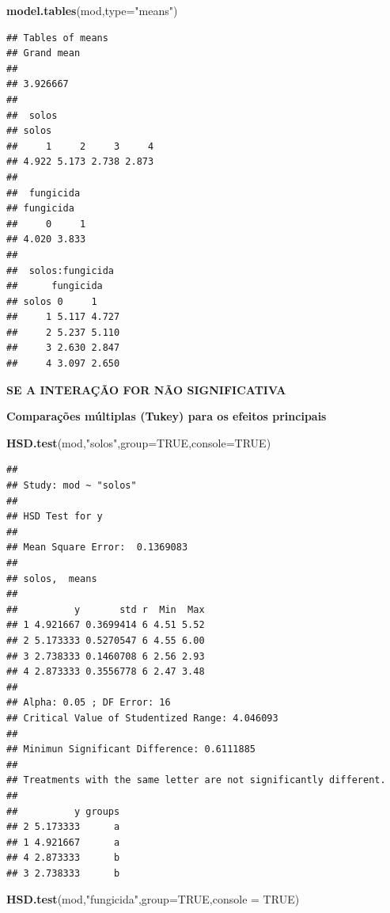 \documentclass[
]{book}
\newenvironment{Shaded}{\begin{snugshade}}{\end{snugshade}}
\newcommand{\DataTypeTok}[1]{\textcolor[rgb]{0.13,0.29,0.53}{#1}}
\newcommand{\KeywordTok}[1]{\textcolor[rgb]{0.13,0.29,0.53}{\textbf{#1}}}
\newcommand{\NormalTok}[1]{#1}
\newcommand{\OtherTok}[1]{\textcolor[rgb]{0.56,0.35,0.01}{#1}}
\newcommand{\StringTok}[1]{\textcolor[rgb]{0.31,0.60,0.02}{#1}}
\begin{document}
\begin{Shaded}
\begin{Highlighting}[]
\KeywordTok{model.tables}\NormalTok{(mod,}\DataTypeTok{type=}\StringTok{"means"}\NormalTok{)}
\end{Highlighting}
\end{Shaded}

\begin{verbatim}
## Tables of means
## Grand mean
##          
## 3.926667 
## 
##  solos 
## solos
##     1     2     3     4 
## 4.922 5.173 2.738 2.873 
## 
##  fungicida 
## fungicida
##     0     1 
## 4.020 3.833 
## 
##  solos:fungicida 
##      fungicida
## solos 0     1    
##     1 5.117 4.727
##     2 5.237 5.110
##     3 2.630 2.847
##     4 3.097 2.650
\end{verbatim}

\textbf{SE A INTERAÇÃO FOR NÃO SIGNIFICATIVA}

\textbf{Comparações múltiplas (Tukey) para os efeitos principais}

\begin{Shaded}
\begin{Highlighting}[]
\KeywordTok{HSD.test}\NormalTok{(mod,}\StringTok{"solos"}\NormalTok{,}\DataTypeTok{group=}\OtherTok{TRUE}\NormalTok{,}\DataTypeTok{console=}\OtherTok{TRUE}\NormalTok{)}
\end{Highlighting}
\end{Shaded}

\begin{verbatim}
## 
## Study: mod ~ "solos"
## 
## HSD Test for y 
## 
## Mean Square Error:  0.1369083 
## 
## solos,  means
## 
##          y       std r  Min  Max
## 1 4.921667 0.3699414 6 4.51 5.52
## 2 5.173333 0.5270547 6 4.55 6.00
## 3 2.738333 0.1460708 6 2.56 2.93
## 4 2.873333 0.3556778 6 2.47 3.48
## 
## Alpha: 0.05 ; DF Error: 16 
## Critical Value of Studentized Range: 4.046093 
## 
## Minimun Significant Difference: 0.6111885 
## 
## Treatments with the same letter are not significantly different.
## 
##          y groups
## 2 5.173333      a
## 1 4.921667      a
## 4 2.873333      b
## 3 2.738333      b
\end{verbatim}

\begin{Shaded}
\begin{Highlighting}[]
\KeywordTok{HSD.test}\NormalTok{(mod,}\StringTok{"fungicida"}\NormalTok{,}\DataTypeTok{group=}\OtherTok{TRUE}\NormalTok{,}\DataTypeTok{console =} \OtherTok{TRUE}\NormalTok{)}
\end{Highlighting}
\end{Shaded}
\end{document}
